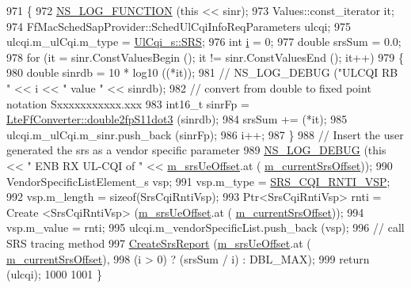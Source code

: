 \begin{DoxyCode}
971 \{
972   \hyperlink{log-macros-disabled_8h_a90b90d5bad1f39cb1b64923ea94c0761}{NS\_LOG\_FUNCTION} (\textcolor{keyword}{this} << sinr);
973   Values::const\_iterator it;
974   FfMacSchedSapProvider::SchedUlCqiInfoReqParameters ulcqi;
975   ulcqi.m\_ulCqi.m\_type = \hyperlink{structns3_1_1UlCqi__s_aece9e5ebea42eb9ff1744c72c8459b57af4b6dba4243636562c910c4d4761dd7e}{UlCqi\_s::SRS};
976   \textcolor{keywordtype}{int} \hyperlink{bernuolliDistribution_8m_a6f6ccfcf58b31cb6412107d9d5281426}{i} = 0;
977   \textcolor{keywordtype}{double} srsSum = 0.0;
978   \textcolor{keywordflow}{for} (it = sinr.ConstValuesBegin (); it != sinr.ConstValuesEnd (); it++)
979     \{
980       \textcolor{keywordtype}{double} sinrdb = 10 * log10 ((*it));
981       \textcolor{comment}{//       NS\_LOG\_DEBUG ("ULCQI RB " << i << " value " << sinrdb);}
982       \textcolor{comment}{// convert from double to fixed point notation Sxxxxxxxxxxx.xxx}
983       int16\_t sinrFp = \hyperlink{classns3_1_1LteFfConverter_a56e66da296e4328530c22036b3549b70}{LteFfConverter::double2fpS11dot3} (sinrdb);
984       srsSum += (*it);
985       ulcqi.m\_ulCqi.m\_sinr.push\_back (sinrFp);
986       i++;
987     \}
988   \textcolor{comment}{// Insert the user generated the srs as a vendor specific parameter}
989   \hyperlink{group__logging_ga413f1886406d49f59a6a0a89b77b4d0a}{NS\_LOG\_DEBUG} (\textcolor{keyword}{this} << \textcolor{stringliteral}{" ENB RX UL-CQI of "} << \hyperlink{classns3_1_1LteEnbPhy_aed120277d3a531a9ccfe9c69cf1636fb}{m\_srsUeOffset}.at (
      \hyperlink{classns3_1_1LteEnbPhy_a8356f950997d27723f4997ddb797e589}{m\_currentSrsOffset}));
990   VendorSpecificListElement\_s vsp;
991   vsp.m\_type = \hyperlink{lte-vendor-specific-parameters_8h_a3b5e6e766032ab4a8e374a1cfd237a26}{SRS\_CQI\_RNTI\_VSP};
992   vsp.m\_length = \textcolor{keyword}{sizeof}(SrsCqiRntiVsp);
993   Ptr<SrsCqiRntiVsp> rnti  = Create <SrsCqiRntiVsp> (\hyperlink{classns3_1_1LteEnbPhy_aed120277d3a531a9ccfe9c69cf1636fb}{m\_srsUeOffset}.at (
      \hyperlink{classns3_1_1LteEnbPhy_a8356f950997d27723f4997ddb797e589}{m\_currentSrsOffset}));
994   vsp.m\_value = rnti;
995   ulcqi.m\_vendorSpecificList.push\_back (vsp);
996   \textcolor{comment}{// call SRS tracing method}
997   \hyperlink{classns3_1_1LteEnbPhy_a0cda53ae858a9e06d1e4c39c2bac5dcc}{CreateSrsReport} (\hyperlink{classns3_1_1LteEnbPhy_aed120277d3a531a9ccfe9c69cf1636fb}{m\_srsUeOffset}.at (
      \hyperlink{classns3_1_1LteEnbPhy_a8356f950997d27723f4997ddb797e589}{m\_currentSrsOffset}),
998                    (i > 0) ? (srsSum / i) : DBL\_MAX);
999   \textcolor{keywordflow}{return} (ulcqi);
1000 
1001 \}
\end{DoxyCode}


